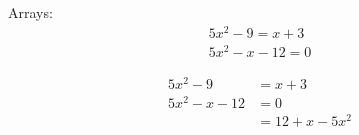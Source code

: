 \documentclass[11pt]{article}
\begin{document}
Arrays:
\begin{align}
5x^2-9=x+3\\
5x^2-x-12=0 %
\end{align}

\begin{align*} %
5x^2-9&=x+3\\ %
5x^2-x-12&=0\\
&=12+x-5x^2 %
\end{align*} %
\end{document}
